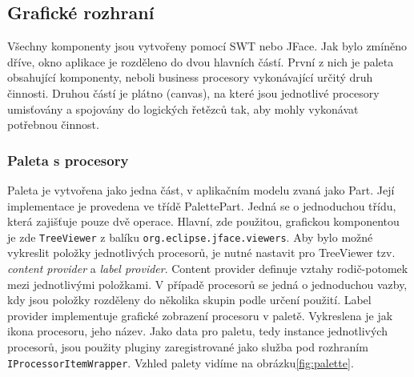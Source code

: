 \documentclass[ing,male,java,dept460]{diploma}		%
\begin{document}
\subsection{Grafické rozhraní}
Všechny komponenty jsou vytvořeny pomocí SWT nebo JFace. Jak bylo zmíněno dříve, okno aplikace je rozděleno do dvou hlavních částí. První z nich je paleta obsahující komponenty, neboli business procesory vykonávající určitý druh činnosti. Druhou částí je plátno (canvas), na které jsou jednotlivé procesory umisťovány a spojovány do logických řetězců tak, aby mohly vykonávat potřebnou činnost.
\subsubsection{Paleta s procesory}
Paleta je vytvořena jako jedna část, v aplikačním modelu zvaná jako Part. Její implementace je provedena ve třídě PalettePart. Jedná se o jednoduchou třídu, která zajišťuje pouze dvě operace. Hlavní, zde použitou, grafickou komponentou je zde \texttt{TreeViewer} z balíku \texttt{org.eclipse.jface.viewers}. Aby bylo možné vykreslit položky jednotlivých procesorů, je nutné nastavit pro TreeViewer tzv. \textit{content provider} a \textit{label provider}. Content provider definuje vztahy rodič-potomek mezi jednotlivými položkami. V případě procesorů se jedná o jednoduchou vazby, kdy jsou položky rozděleny do několika skupin podle určení použití. Label provider implementuje grafické zobrazení procesoru v paletě. Vykreslena je jak ikona procesoru, jeho název. Jako data pro paletu, tedy instance jednotlivých procesorů, jsou použity pluginy zaregistrované jako služba pod rozhraním \texttt{IProcessorItemWrapper}. Vzhled palety vidíme na obrázku\ref{fig:palette}.
\end{document}

